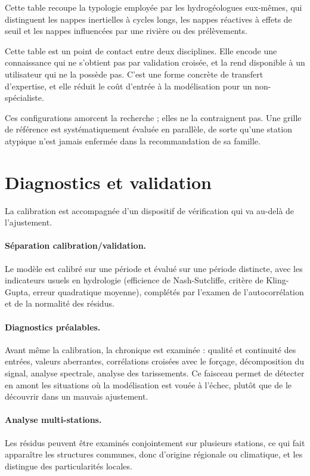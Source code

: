 Cette table recoupe la typologie employée par les hydrogéologues eux-mêmes, qui distinguent les
nappes inertielles à cycles longs, les nappes réactives à effets de seuil et les nappes
influencées par une rivière ou des prélèvements.

Cette table est un point de contact entre deux disciplines. Elle encode une connaissance qui ne
s'obtient pas par validation croisée, et la rend disponible à un utilisateur qui ne la possède
pas. C'est une forme concrète de transfert d'expertise, et elle réduit le coût d'entrée à la
modélisation pour un non-spécialiste.

Ces configurations amorcent la recherche ; elles ne la contraignent pas. Une grille de référence
est systématiquement évaluée en parallèle, de sorte qu'une station atypique n'est jamais
enfermée dans la recommandation de sa famille.

\section{Diagnostics et validation}

La calibration est accompagnée d'un dispositif de vérification qui va au-delà de l'ajustement.

\paragraph{Séparation calibration/validation.} Le modèle est calibré sur une période et évalué
sur une période distincte, avec les indicateurs usuels en hydrologie (efficience de
Nash-Sutcliffe, critère de Kling-Gupta, erreur quadratique moyenne), complétés par l'examen de
l'autocorrélation et de la normalité des résidus.

\paragraph{Diagnostics préalables.} Avant même la calibration, la chronique est examinée :
qualité et continuité des entrées, valeurs aberrantes, corrélations croisées avec le forçage,
décomposition du signal, analyse spectrale, analyse des tarissements. Ce faisceau permet de
détecter en amont les situations où la modélisation est vouée à l'échec, plutôt que de le
découvrir dans un mauvais ajustement.

\paragraph{Analyse multi-stations.} Les résidus peuvent être examinés conjointement sur
plusieurs stations, ce qui fait apparaître les structures communes, donc d'origine régionale ou
climatique, et les distingue des particularités locales.

